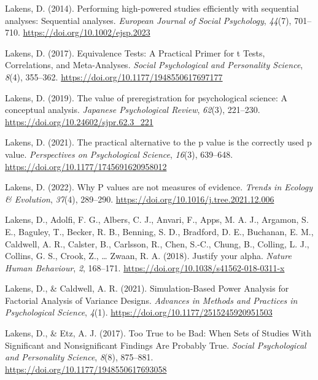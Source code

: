 \documentclass[
  letterpaper,
  DIV=11,
  numbers=noendperiod]{scrreprt}
\newlength{\cslhangindent}
\newlength{\cslentryspacingunit} %
\newenvironment{CSLReferences}[2] %
 {%
  \setlength{\parindent}{0pt}
  \ifodd #1
  \let\oldpar\par
  \def\par{\hangindent=\cslhangindent\oldpar}
  \fi
  \setlength{\parskip}{#2\cslentryspacingunit}
 }%
 {}
\begin{document}
\begin{CSLReferences}{1}{0}
\leavevmode{}%
Lakens, D. (2014). Performing high-powered studies efficiently with
sequential analyses: {Sequential} analyses. \emph{European Journal of
Social Psychology}, \emph{44}(7), 701--710.
\url{https://doi.org/10.1002/ejsp.2023}

\leavevmode{}%
Lakens, D. (2017). Equivalence {Tests}: {A Practical Primer} for t
{Tests}, {Correlations}, and {Meta-Analyses}. \emph{Social Psychological
and Personality Science}, \emph{8}(4), 355--362.
\url{https://doi.org/10.1177/1948550617697177}

\leavevmode{}%
Lakens, D. (2019). The value of preregistration for psychological
science: {A} conceptual analysis. \emph{Japanese Psychological Review},
\emph{62}(3), 221--230. \url{https://doi.org/10.24602/sjpr.62.3_221}

\leavevmode{}%
Lakens, D. (2021). The practical alternative to the p value is the
correctly used p value. \emph{Perspectives on Psychological Science},
\emph{16}(3), 639--648. \url{https://doi.org/10.1177/1745691620958012}

\leavevmode{}%
Lakens, D. (2022). Why {P} values are not measures of evidence.
\emph{Trends in Ecology \& Evolution}, \emph{37}(4), 289--290.
\url{https://doi.org/10.1016/j.tree.2021.12.006}

\leavevmode{}%
Lakens, D., Adolfi, F. G., Albers, C. J., Anvari, F., Apps, M. A. J.,
Argamon, S. E., Baguley, T., Becker, R. B., Benning, S. D., Bradford, D.
E., Buchanan, E. M., Caldwell, A. R., Calster, B., Carlsson, R., Chen,
S.-C., Chung, B., Colling, L. J., Collins, G. S., Crook, Z., \ldots{}
Zwaan, R. A. (2018). Justify your alpha. \emph{Nature Human Behaviour},
\emph{2}, 168--171. \url{https://doi.org/10.1038/s41562-018-0311-x}

\leavevmode{}%
Lakens, D., \& Caldwell, A. R. (2021). Simulation-{Based Power Analysis}
for {Factorial Analysis} of {Variance Designs}. \emph{Advances in
Methods and Practices in Psychological Science}, \emph{4}(1).
\url{https://doi.org/10.1177/2515245920951503}

\leavevmode{}%
Lakens, D., \& Etz, A. J. (2017). Too {True} to be {Bad}: {When Sets} of
{Studies With Significant} and {Nonsignificant Findings Are Probably
True}. \emph{Social Psychological and Personality Science}, \emph{8}(8),
875--881. \url{https://doi.org/10.1177/1948550617693058}


\end{CSLReferences}
\end{document}
